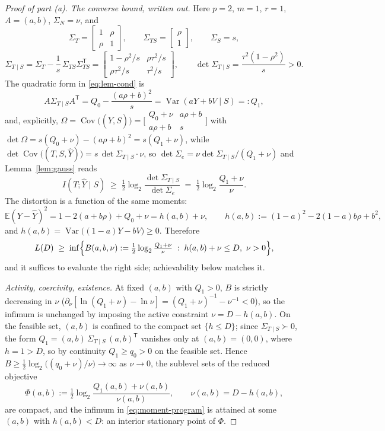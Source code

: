 \documentclass[11pt,onecolumn]{IEEEtran}
\newcommand{\E}{\mathbb{E}}
\newcommand{\Cov}{\operatorname{Cov}}
\newcommand{\hY}{\widehat{Y}}
\begin{document}
\begin{proof}[Proof of part (a)]
\emph{The converse bound, written out.} Here $p=2$, $m=1$, $r=1$,
$A=(a,b)$, $\Sigma_N=\nu$, and
\[
\Sigma_T=\begin{bmatrix}1&\rho\\ \rho&1\end{bmatrix},
\qquad
\Sigma_{TS}=\begin{bmatrix}\rho\\ 1\end{bmatrix},
\qquad
\Sigma_S=s,
\]
\[
\Sigma_{T\mid S}
=\Sigma_T-\frac1s\,\Sigma_{TS}\Sigma_{TS}^{\mathsf T}
=\begin{bmatrix}1-\rho^2/s&\rho\tau^2/s\\[2pt]
\rho\tau^2/s&\tau^2/s\end{bmatrix},
\qquad
\det\Sigma_{T\mid S}=\frac{\tau^2(1-\rho^2)}{s}>0 .
\]
The quadratic form in \eqref{eq:lem-cond} is
\[
A\Sigma_{T\mid S}A^{\mathsf T}
=Q_0-\frac{(a\rho+b)^2}{s}
=\operatorname{Var}(aY+bV\mid S)=:Q_1 ,
\]
and, explicitly, $\Omega=\Cov\bigl((\hY,S)\bigr)=
\bigl[\begin{smallmatrix}Q_0+\nu&a\rho+b\\ a\rho+b&s\end{smallmatrix}\bigr]$
with $\det\Omega=s(Q_0+\nu)-(a\rho+b)^2=s(Q_1+\nu)$, while
$\det\Cov\bigl((T,S,\hY)\bigr)=s\,\det\Sigma_{T\mid S}\cdot \nu$, so
$\det\Sigma_e=\nu\det\Sigma_{T\mid S}/(Q_1+\nu)$ and Lemma~\ref{lem:gauss}
reads
\begin{equation}
I(T;\hY\mid S)\;\ge\;
\tfrac12\log_2\frac{\det\Sigma_{T\mid S}}{\det\Sigma_e}
\;=\;\tfrac12\log_2\frac{Q_1+\nu}{\nu} .
\label{eq:scalar-detid}
\end{equation}
The distortion is a function of the same moments:
\begin{equation}
\E(Y-\hY)^2=1-2(a+b\rho)+Q_0+\nu=h(a,b)+\nu,
\qquad
h(a,b):=(1-a)^2-2(1-a)b\rho+b^2,
\label{eq:distortion}
\end{equation}
and $h(a,b)=\operatorname{Var}\bigl((1-a)Y-bV\bigr)\ge0$. Therefore
\begin{equation}
L(D)\;\ge\;
\inf\Bigl\{B(a,b,\nu):=\tfrac12\log_2\tfrac{Q_1+\nu}{\nu}
\;:\;h(a,b)+\nu\le D,\ \nu>0\Bigr\},
\label{eq:moment-program}
\end{equation}
and it suffices to evaluate the right side; achievability below
matches it.

\emph{Activity, coercivity, existence.} At fixed $(a,b)$ with $Q_1>0$,
$B$ is strictly decreasing in $\nu$
($\partial_\nu[\ln(Q_1+\nu)-\ln \nu]=(Q_1+\nu)^{-1}-\nu^{-1}<0$), so the infimum
is unchanged by imposing the active constraint $\nu=D-h(a,b)$. On the
feasible set, $(a,b)$ is confined to the compact set $\{h\le D\}$;
since $\Sigma_{T\mid S}\succ0$, the form
$Q_1=(a,b)\,\Sigma_{T\mid S}\,(a,b)^{\mathsf T}$ vanishes only at
$(a,b)=(0,0)$, where $h=1>D$, so by continuity $Q_1\ge q_0>0$ on the
feasible set. Hence $B\ge\tfrac12\log_2\bigl((q_0+\nu)/\nu\bigr)\to\infty$
as $\nu\to0$, the sublevel sets of the reduced objective
\[
\Phi(a,b):=\tfrac12\log_2\frac{Q_1(a,b)+\nu(a,b)}{\nu(a,b)},
\qquad \nu(a,b)=D-h(a,b),
\]
are compact, and the infimum in \eqref{eq:moment-program} is attained
at some $(a,b)$ with $h(a,b)<D$: an interior stationary point of
$\Phi$.


\end{proof}
\end{document}
